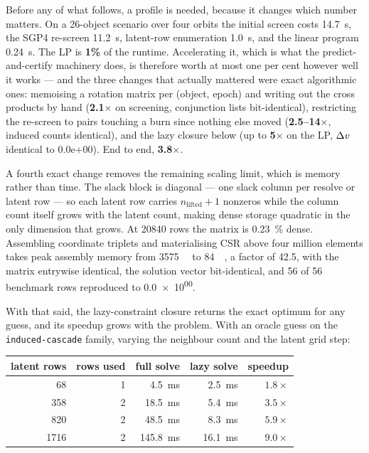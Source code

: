 Before any of what follows, a profile is needed, because it changes which
number matters. On a 26-object scenario over four orbits the initial screen
costs \SI{14.7}{\second}, the SGP4 re-screen \SI{11.2}{\second}, latent-row
enumeration \SI{1.0}{\second}, and the linear program \SI{0.24}{\second}. The
LP is \textbf{1\%} of the runtime. Accelerating it, which is what the
predict-and-certify machinery does, is therefore worth at most one per cent
however well it works --- and the three changes that actually mattered were
exact algorithmic ones: memoising a rotation matrix per (object, epoch) and
writing out the cross products by hand (\textbf{2.1$\times$} on screening,
conjunction lists bit-identical), restricting the re-screen to pairs touching a
burn since nothing else moved (\textbf{2.5--14$\times$}, induced counts
identical), and the lazy closure below (up to \textbf{5$\times$} on the LP,
$\Delta v$ identical to 0.0e+00). End to end, \textbf{3.8$\times$}.

A fourth exact change removes the remaining scaling limit, which is memory
rather than time. The slack block is diagonal --- one slack column per resolve
or latent row --- so each latent row carries $n_{\text{lifted}}+1$ nonzeros
while the column count itself grows with the latent count, making dense storage
quadratic in the only dimension that grows. At \num{20840} rows the matrix is
\SI{0.23}{\percent} dense. Assembling coordinate triplets and materialising CSR
above four million elements takes peak assembly memory from \SI{3575}{\mega\byte}
to \SI{84}{\mega\byte}, a factor of \num{42.5}, with the matrix entrywise
identical, the solution vector bit-identical, and 56 of 56 benchmark rows
reproduced to \num{0.0e+00}.

With that said, the lazy-constraint closure returns the exact optimum for any
guess, and its speedup grows with the problem. With an oracle guess on the
\texttt{induced-cascade} family, varying the neighbour count and the latent
grid step:

\begin{center}
\begin{tabular}{rrrrr}
\toprule
latent rows & rows used & full solve & lazy solve & speedup \\
\midrule
   68 & 1 & \SI{4.5}{\milli\second}   & \SI{2.5}{\milli\second}  & $1.8\times$ \\
  358 & 2 & \SI{18.5}{\milli\second}  & \SI{5.4}{\milli\second}  & $3.5\times$ \\
  820 & 2 & \SI{48.5}{\milli\second}  & \SI{8.3}{\milli\second}  & $5.9\times$ \\
 1716 & 2 & \SI{145.8}{\milli\second} & \SI{16.1}{\milli\second} & $\mathbf{9.0\times}$ \\
\bottomrule
\end{tabular}
\end{center}


